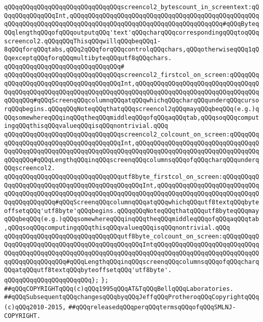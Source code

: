 \verb|qQQqqQQqqQQqqQQqqQQqqQQqqQQqqQQqscreencol2_bytescount_in_screentext:qQQqqQQqqQQqqQQqInt,qQQqqQQqqQQqqQQqqQQqqQQqqQQqqQQqqQQqqQQqqQQqqQQqqQQqqQQqqQQqqQQqqQQqqQQqqQQqqQQqqQQqqQQqqQQqqQQqqQQqqQQqqQQqqQQq#qQQqByteqQQqlengthqQQqofqQQqoutputqQQq'text'qQQqcharqQQqcorrespondingqQQqtoqQQqscreencol2.qQQqqQQqThisqQQqwillqQQqbeqQQq1-8qQQqforqQQqtabs,qQQq2qQQqforqQQqcontrolqQQqchars,qQQqotherwiseqQQq1qQQqexceptqQQqforqQQqmultibyteqQQqutf8qQQqchars.|\newline
\verb|qQQqqQQqqQQqqQQqqQQqqQQqqQQqqQQq#|\newline
\verb|qQQqqQQqqQQqqQQqqQQqqQQqqQQqqQQqscreencol2_firstcol_on_screen:qQQqqQQqqQQqqQQqqQQqqQQqqQQqqQQqqQQqqQQqInt,qQQqqQQqqQQqqQQqqQQqqQQqqQQqqQQqqQQqqQQqqQQqqQQqqQQqqQQqqQQqqQQqqQQqqQQqqQQqqQQqqQQqqQQqqQQqqQQqqQQqqQQqqQQqqQQq#qQQqScreenqQQqcolumnqQQqatqQQqwhichqQQqcharqQQqunderqQQqcursorqQQqbegins.qQQqqQQqNoteqQQqthatqQQqscreencol2qQQqmayqQQqbeqQQq(e.g.)qQQqsomewhereqQQqinqQQqtheqQQqmiddleqQQqofqQQqaqQQqtab,qQQqsoqQQqcomputingqQQqthisqQQqvalueqQQqisqQQqnontrivial.qQQq|\newline
\verb|qQQqqQQqqQQqqQQqqQQqqQQqqQQqqQQqscreencol2_colcount_on_screen:qQQqqQQqqQQqqQQqqQQqqQQqqQQqqQQqqQQqqQQqInt,qQQqqQQqqQQqqQQqqQQqqQQqqQQqqQQqqQQqqQQqqQQqqQQqqQQqqQQqqQQqqQQqqQQqqQQqqQQqqQQqqQQqqQQqqQQqqQQqqQQqqQQqqQQqqQQq#qQQqLengthqQQqinqQQqscreenqQQqcolumnsqQQqofqQQqcharqQQqunderqQQqscreencol2.|\newline
\newline
\verb|qQQqqQQqqQQqqQQqqQQqqQQqqQQqqQQqutf8byte_firstcol_on_screen:qQQqqQQqqQQqqQQqqQQqqQQqqQQqqQQqqQQqqQQqqQQqqQQqInt,qQQqqQQqqQQqqQQqqQQqqQQqqQQqqQQqqQQqqQQqqQQqqQQqqQQqqQQqqQQqqQQqqQQqqQQqqQQqqQQqqQQqqQQqqQQqqQQqqQQqqQQqqQQqqQQq#qQQqScreenqQQqcolumnqQQqatqQQqwhichqQQqutf8textqQQqbyteoffsetqQQq'utf8byte'qQQqbegins.qQQqqQQqNoteqQQqthatqQQqutf8byteqQQqmayqQQqbeqQQq(e.g.)qQQqsomewhereqQQqinqQQqtheqQQqmiddleqQQqofqQQqaqQQqtab,qQQqsoqQQqcomputingqQQqthisqQQqvalueqQQqisqQQqnontrivial.qQQq|\newline
\verb|qQQqqQQqqQQqqQQqqQQqqQQqqQQqqQQqutf8byte_colcount_on_screen:qQQqqQQqqQQqqQQqqQQqqQQqqQQqqQQqqQQqqQQqqQQqqQQqIntqQQqqQQqqQQqqQQqqQQqqQQqqQQqqQQqqQQqqQQqqQQqqQQqqQQqqQQqqQQqqQQqqQQqqQQqqQQqqQQqqQQqqQQqqQQqqQQqqQQqqQQqqQQqqQQqqQQq#qQQqLengthqQQqinqQQqscreenqQQqcolumnsqQQqofqQQqcharqQQqatqQQqutf8textqQQqbyteoffsetqQQq'utf8byte'.|\newline
\verb|qQQqqQQqqQQqqQQqqQQqqQQq};|\newline
\verb|};|\newline
\newline
\newline
\verb|##qQQqCOPYRIGHTqQQq(c)qQQq1995qQQqAT&TqQQqBellqQQqLaboratories.|\newline
\verb|##qQQqSubsequentqQQqchangesqQQqbyqQQqJeffqQQqProtheroqQQqCopyrightqQQq(c)qQQq2010-2015,|\newline
\verb|##qQQqreleasedqQQqperqQQqtermsqQQqofqQQqSMLNJ-COPYRIGHT.|\newline

